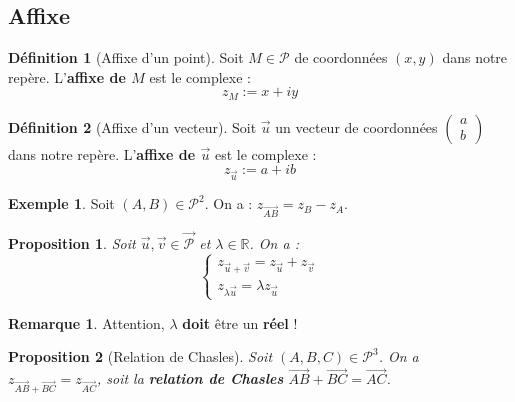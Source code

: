 \documentclass[french]{book}
\newcommand{\R}{\mathbb{R}}
\theoremstyle{plain}
\newtheorem{prop}{Proposition}[chapter]
\theoremstyle{definition}
\newtheorem{dfn}{Définition}[chapter]
\newtheorem{exa}{Exemple}[chapter]
\newtheorem{rmq}{Remarque}[chapter]
\theoremstyle{remark}
\begin{document}
\subsection{Affixe}
\begin{dfn}[Affixe d'un point]
	Soit $M\in\mathcal{P}$ de coordonnées $(x,y)$ dans notre repère. L'\textbf{affixe de $M$} est le complexe : $$z_M:=x+iy$$
\end{dfn}
\begin{dfn}[Affixe d'un vecteur]
	Soit $\overrightarrow{u}$ un vecteur de coordonnées $\displaystyle\begin{pmatrix}a\\ b\end{pmatrix}$ dans notre repère. L'\textbf{affixe de $\overrightarrow{u}$} est le complexe : $$z_{\overrightarrow{u}}:=a+ib$$
\end{dfn}
\begin{exa}
	Soit $(A,B)\in\mathcal{P}^2$. On a : $z_{\overrightarrow{AB}}=z_B-z_A$.
\end{exa}
\begin{prop}
	Soit $\overrightarrow{u},\overrightarrow{v}\in\overrightarrow{\mathcal{P}}$ et $\lambda\in\R$. On a : $$\begin{cases}
		z_{\overrightarrow{u}+\overrightarrow{v}}=z_{\overrightarrow{u}}+z_{\overrightarrow{v}} \\ z_{\lambda\overrightarrow{u}}=\lambda z_{\overrightarrow{u}}
	\end{cases}$$
\end{prop}
\begin{rmq}
	Attention, $\lambda$ \textbf{doit} être un \textbf{réel} !
\end{rmq}
\begin{prop}[Relation de Chasles]
	Soit $(A,B,C)\in\mathcal{P}^3$. On a $z_{\overrightarrow{AB}+\overrightarrow{BC}}=z_{\overrightarrow{AC}}$, soit la \textbf{relation de Chasles} $\overrightarrow{AB}+\overrightarrow{BC}=\overrightarrow{AC}$.
\end{prop}
\end{document}
